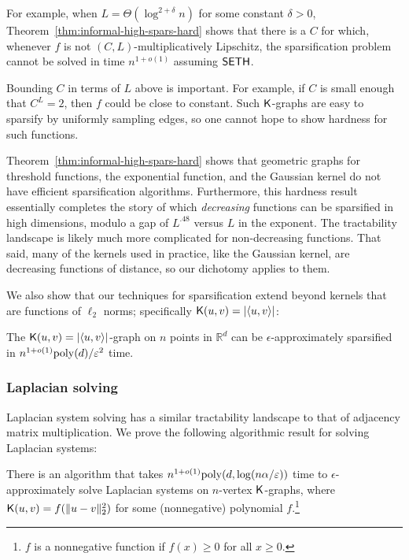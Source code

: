 For example, when $L = \Theta(\log^{2+\delta} n)$ for some constant $\delta > 0$, Theorem~\ref{thm:informal-high-spars-hard} shows that there is a $C$ for which, whenever $f$ is not $(C,L)$-multiplicatively Lipschitz, the sparsification problem cannot be solved in time $n^{1+o(1)}$ assuming $\mathsf{SETH}$.

Bounding $C$ in terms of $L$ above is important. For example, if $C$ is small enough that $C^L = 2$, then $f$ could be close to constant. Such $\mathsf{K}$-graphs are easy to sparsify by uniformly sampling edges, so one cannot hope to show hardness for such functions.

Theorem~\ref{thm:informal-high-spars-hard} shows that geometric graphs for threshold functions, the exponential function, and the Gaussian kernel do not have efficient sparsification algorithms. Furthermore, this hardness result essentially completes the story of which \emph{decreasing} functions can be sparsified in high dimensions, modulo a gap of $L^{.48}$ versus $L$ in the exponent. The tractability landscape is likely much more complicated for non-decreasing functions. That said, many of the kernels used in practice, like the Gaussian kernel, are decreasing functions of distance, so our dichotomy applies to them.

We also show that our techniques for sparsification extend beyond kernels that are functions of $\ell_2$ norms; specifically $\mathsf{K}(u,v) = |\langle u,v\rangle|$:

\begin{lemma}\label{thm:sparsabsinnerproduct} %
The $\mathsf{K}(u,v) = |\langle u,v\rangle|$-graph on $n$ points in $\mathbb{R}^d$ can be $\epsilon$-approximately sparsified in $n^{1+o(1)} \mathrm{poly}(d) /\varepsilon^2$ time.
\end{lemma}

\subsubsection{Laplacian solving}

Laplacian system solving has a similar tractability landscape to that of adjacency matrix multiplication. We prove the following algorithmic result for solving Laplacian systems:

\begin{theorem}\label{thm:informal-lapl-poly}
There is an algorithm that takes $ n^{1+o(1)} \mathrm{poly}(d,\log(n\alpha/\varepsilon))$ time to $\epsilon$-approximately solve Laplacian systems on $n$-vertex $\mathsf{K}$-graphs, where $\mathsf{K}(u,v) = f(\|u-v\|_2^2)$ for some (nonnegative) polynomial $f$.\footnote{$f$ is a nonnegative function if $f(x) \geq 0$ for all $x \geq 0$.}
\end{theorem}

